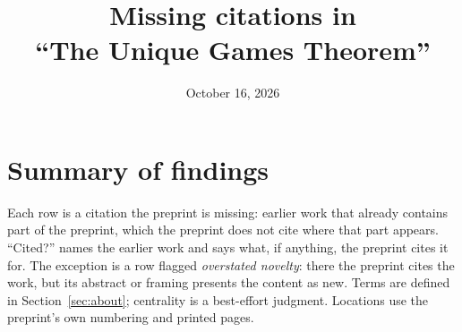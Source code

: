 \documentclass[11pt]{article}
\title{Missing citations in\\ ``The Unique Games Theorem''}
\date{October 16, 2026}
\newcounter{finding}
\begin{document}
\maketitle

\section*{Summary of findings}

Each row is a citation the preprint is missing: earlier work that already
contains part of the preprint, which the preprint does not cite where that
part appears. ``Cited?'' names the earlier work and says what, if anything, the
preprint cites it for. The exception is a row flagged \emph{overstated
novelty}: there the preprint cites the work, but its abstract or framing
presents the content as new. Terms are defined in Section~\ref{sec:about};
centrality is a best-effort judgment. Locations use the preprint's own
numbering and printed pages.
\end{document}
